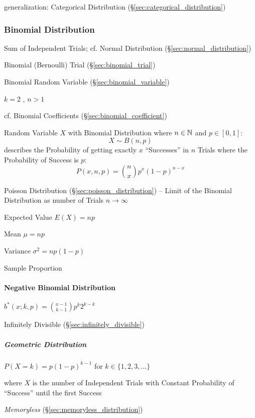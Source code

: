 generalization: Categorical Distribution (\S\ref{sec:categorical_distribution})



\subsubsection{Binomial Distribution}\label{sec:binomial_distribution}

Sum of Independent Trials; cf. Normal Distribution
(\S\ref{sec:normal_distribution})

Binomial (Bernoulli) Trial (\S\ref{sec:binomial_trial})

Binomial Random Variable (\S\ref{sec:binomial_variable})

$k = 2$ , $n > 1$

cf. Binomial Coefficients (\S\ref{sec:binomial_coefficient})

Random Variable $X$ with Binomial Distribution where $n \in \mathbb{N}$ and
$p \in [0,1]$:
\[
  X \sim B(n,p)
\]
describes the Probability of getting exactly $x$ ``Successes'' in $n$ Trials
where the Probability of Success is $p$:
\[
  P(x,n,p) = \binom{n}{x}p^x(1-p)^{n-x}
\]

\fist Poisson Distribution (\S\ref{sec:poisson_distribution}) -- Limit of the
Binomial Distribution as number of Trials $n \to \infty$

Expected Value $E(X) = np$

Mean $\mu = n p$

Variance $\sigma^2 = n p (1-p)$

Sample Proportion %



\paragraph{Negative Binomial Distribution}\label{sec:negative_binomial}\hfill

$b^*(x; k,p) = \binom{x-1}{k-1} p^k 2^{k-k}$

Infinitely Divisible (\S\ref{sec:infinitely_divisible})



\subparagraph{Geometric Distribution}\label{sec:geometric_distribution}\hfill

$P(X = k) = p(1-p)^{k-1}$ for $k \in \{1, 2, 3, \ldots\}$

where $X$ is the number of Independent Trials with Constant Probability of
``Success'' until the first Success

\emph{Memoryless} (\S\ref{sec:memoryless_distribution})

